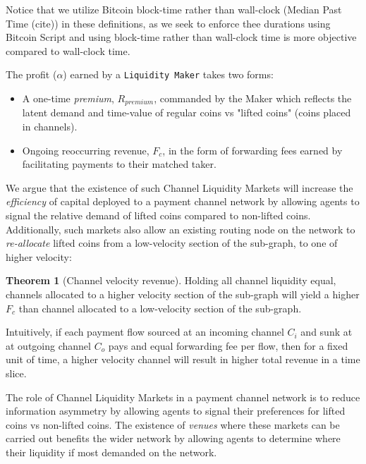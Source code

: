 \documentclass[12pt,a4paper]{article}
\theoremstyle{definition}
\newtheorem{theorem}{Theorem}[section]
\begin{document}
Notice that we utilize Bitcoin block-time rather than wall-clock (Median Past
Time (cite)) in these definitions, as we seek to enforce thee durations using
Bitcoin Script and using block-time rather than wall-clock time is more
objective compared to wall-clock time. 

The profit ($\alpha$) earned by a \texttt{Liquidity Maker} takes two forms: 
\begin{itemize}
   \item A one-time \emph{premium}, $R_{premium}$, commanded by the Maker which
       reflects the latent demand and time-value of regular coins vs "lifted
       coins" (coins placed in channels). 

   \item Ongoing reoccurring revenue, $F_c$,  in the form of forwarding fees
       earned by facilitating payments to their matched taker. 
\end{itemize} 


We argue that the existence of such Channel Liquidity Markets will increase the
\emph{efficiency} of capital deployed to a payment channel network by allowing
agents to signal the relative demand of lifted coins compared to non-lifted
coins. Additionally, such markets also allow an existing routing node on the
network to \emph{re-allocate} lifted coins from a low-velocity section of the
sub-graph, to one of higher velocity: 

\begin{theorem}[Channel velocity revenue] %
Holding all channel liquidity equal, channels allocated to a higher velocity
section of the sub-graph will yield a higher $F_c$  than channel allocated to a
low-velocity section of the sub-graph. 
\end{theorem}

Intuitively, if each payment flow sourced at an incoming channel $C_i$ and sunk
at at outgoing channel $C_o$ pays and equal forwarding fee per flow, then for a
fixed unit of time, a higher velocity channel will result in higher total
revenue in a time slice. 

The role of Channel Liquidity Markets in a payment channel network is to reduce
information asymmetry by allowing agents to signal their preferences for lifted
coins vs non-lifted coins. The existence of \emph{venues} where these markets
can be carried out benefits the wider network by allowing agents to determine
where their liquidity if most demanded on the network. %
\end{document}
